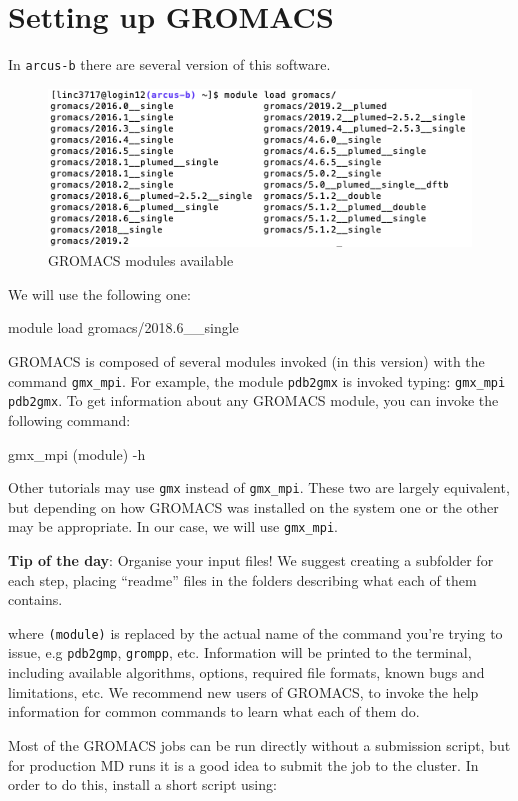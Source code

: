 \documentclass[10pt]{article}
\begin{document}
\section{Setting up GROMACS}
In \texttt{arcus-b} there are several version of this software. \begin{figure}[H]
 \centering
 \includegraphics[scale=0.5]{./img/gromacs}
 \caption{GROMACS modules available}
\end{figure}
We will use the following one:
\begin{cmdline}
module load gromacs/2018.6__single
\end{cmdline}

GROMACS is composed of several modules invoked (in this version) with the command \texttt{gmx\_mpi}. For example, the module \texttt{pdb2gmx} is invoked typing: \texttt{gmx\_mpi pdb2gmx}. To get information about any GROMACS module, you can invoke the following command:

\begin{cmdline}
gmx_mpi (module) -h
\end{cmdline}

Other tutorials may use \texttt{gmx} instead of \texttt{gmx\_mpi}. These two are largely equivalent, but depending on how GROMACS was installed on the system one or the other may be appropriate. In our case, we will use \texttt{gmx\_mpi}.

\textbf{Tip of the day}: Organise your input files! We suggest creating a subfolder for each step, placing ``readme'' files in the folders describing what each of them contains.

where \texttt{(module)} is replaced by the actual name of the command you're trying to issue, e.g \texttt{pdb2gmp}, \texttt{grompp}, etc. Information will be printed to the terminal, including available algorithms, options, required file formats, known bugs and limitations, etc. We recommend new users of GROMACS, to invoke the help information for common commands to learn what each of them do. 

Most of the GROMACS jobs can be run directly without a submission script, but for production MD runs it is a good idea to submit the job to the cluster. In order to do this, install a short script using:
\end{document}
